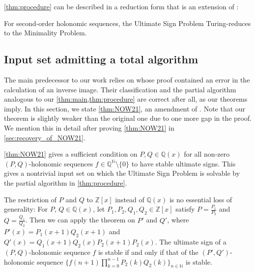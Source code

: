 \documentclass[a4paper,UKenglish,cleveref,autoref,thm-restate]{lipics-v2021}
\newcommand{\N}{\mathbb{N}}
\newcommand{\Q}{\mathbb{Q}}
\newcommand{\Z}{\mathbb{Z}}
\begin{document}
\cref{thm:procedure} can be described in a reduction form that is an extension of \cite[Theorem~3.1]{KKL+21}: 

\begin{theorem}\label{thm:problem_reduction}
    For second-order holonomic sequences, the Ultimate Sign Problem Turing-reduces to the Minimality Problem. 
\end{theorem}


\subsection{Input set admitting a total algorithm}\label{sec:total_algorithm}

The main predecessor to our work \cite[Theorem 1, 3 and 7]{NOW21} 
relies on \cite[Lemma 14]{NOW21} whose proof contained an error in the calculation of an inverse image. 
Their classification and the partial algorithm \cite[Theorem 1 and 3]{NOW21} 
analogous to our \cref{thm:main,thm:procedure}
are correct after all, as our theorems imply. 
In this section, we state \cref{thm:NOW21}, an amendment of \cite[Theorem 7]{NOW21}. 
Note that our theorem is slightly weaker than the original one due to one more gap in the proof. We mention this in detail after proving \cref{thm:NOW21} in \cref{sec:recovery_of_NOW21}.

\cref{thm:NOW21} gives a sufficient condition on $P, Q \in \Q(x)$ 
for all non-zero $(P, Q)$-holonomic sequences $f \in \Q^{\N} \setminus \{ 0 \}$ to have 
stable ultimate signs. This gives a nontrivial input set on which the Ultimate Sign Problem is solvable by the partial algorithm in \cref{thm:procedure}. 

The restriction of $P$ and $Q$ to $\Z[x]$ instead of $\Q(x)$ is no essential loss of generality: 
For $P$, $Q \in \Q(x)$, 
let $P_1, P_2, Q_1, Q_2\in \Z[x]$
satisfy $P = \frac{P_1}{P_2}$ and $Q = \frac{Q_1}{Q_2}$. Then we can apply the theorem on $P'$ and $Q'$, 
where $P' (x) = P_1(x+1)Q_2(x+1)$ and $Q' (x) = Q_1(x+1)Q_2(x)P_2(x+1)P_2(x)$. 
The ultimate sign of a $(P, Q)$-holonomic sequence $f$ is stable
if and only if that of the $(P', Q')$-holonomic sequence 
$\{  f(n+1)\prod_{k=0}^{n-1}P_2(k)Q_2(k) \}_{n \in \N}$ is stable. 
\end{document}

